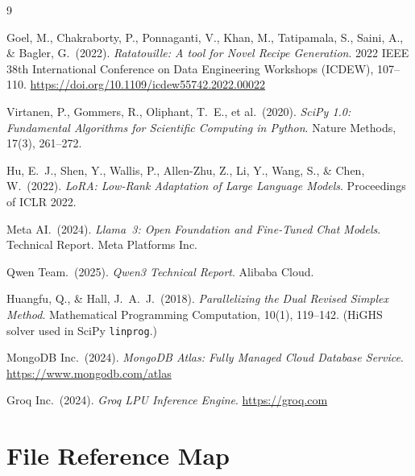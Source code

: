 \documentclass[12pt, a4paper]{article}
\begin{document}
\newpage
\begin{thebibliography}{9}

  Goel, M., Chakraborty, P., Ponnaganti, V., Khan, M., Tatipamala, S., Saini, A., \& Bagler, G.\ (2022).
  \textit{Ratatouille: A tool for Novel Recipe Generation}.
  2022 IEEE 38th International Conference on Data Engineering Workshops (ICDEW), 107--110. \url{https://doi.org/10.1109/icdew55742.2022.00022}

  Virtanen, P., Gommers, R., Oliphant, T.\ E., et al.\ (2020).
  \textit{SciPy 1.0: Fundamental Algorithms for Scientific Computing in Python}.
  Nature Methods, 17(3), 261--272.

  Hu, E.\ J., Shen, Y., Wallis, P., Allen-Zhu, Z., Li, Y., Wang, S., \& Chen, W.\ (2022).
  \textit{LoRA: Low-Rank Adaptation of Large Language Models}.
  Proceedings of ICLR 2022.

  Meta AI.\ (2024).
  \textit{Llama~3: Open Foundation and Fine-Tuned Chat Models}.
  Technical Report. Meta Platforms Inc.

  Qwen Team.\ (2025).
  \textit{Qwen3 Technical Report}.
  Alibaba Cloud.

  Huangfu, Q., \& Hall, J.\ A.\ J.\ (2018).
  \textit{Parallelizing the Dual Revised Simplex Method}.
  Mathematical Programming Computation, 10(1), 119--142.
  (HiGHS solver used in SciPy \texttt{linprog}.)

  MongoDB Inc.\ (2024).
  \textit{MongoDB Atlas: Fully Managed Cloud Database Service}.
  \url{https://www.mongodb.com/atlas}

  Groq Inc.\ (2024).
  \textit{Groq LPU Inference Engine}.
  \url{https://groq.com}

\end{thebibliography}

\newpage
\appendix
\section{File Reference Map}
\end{document}

